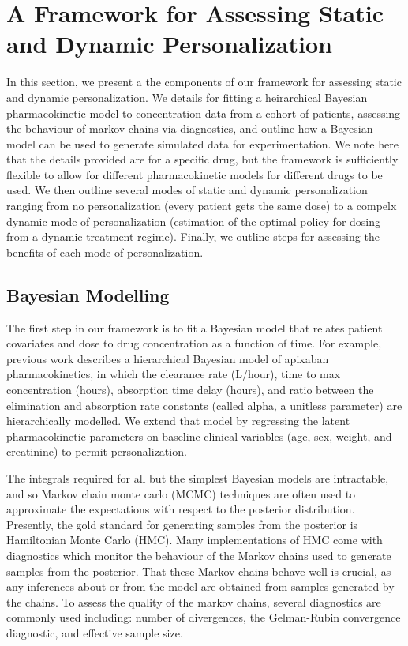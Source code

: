 \section{A Framework for Assessing Static and Dynamic Personalization}\label{ss:framework}

In this section, we present a the components of our framework for assessing static and dynamic personalization.  We details for fitting a heirarchical Bayesian pharmacokinetic model to concentration data from a cohort of patients, assessing the behaviour of markov chains via diagnostics, and outline how a Bayesian model can be used to generate simulated data for experimentation.  We note here that the details provided are for a specific drug, but the framework is sufficiently flexible to allow for different pharmacokinetic models for different drugs to be used. We then outline several modes of static and dynamic personalization ranging from no personalization (every patient gets the same dose) to a compelx dynamic mode of personalization (estimation of the optimal policy for dosing from a dynamic treatment regime).  Finally, we outline steps for assessing the benefits of each mode of personalization.

\subsection{Bayesian Modelling}

The first step in our framework is to fit a Bayesian model that relates patient covariates and dose to drug concentration as a function of time. For example, previous work \cite{pananos2020comparisons} describes a hierarchical Bayesian model of apixaban pharmacokinetics, in which the clearance rate (L/hour), time to max concentration (hours), absorption time delay (hours), and ratio between the elimination and absorption rate constants (called alpha, a unitless parameter) are hierarchically modelled.  We extend that model by regressing the latent pharmacokinetic parameters on baseline clinical variables (age, sex, weight, and creatinine) to permit personalization.

The integrals required for all but the simplest Bayesian models are intractable, and so Markov chain monte carlo (MCMC) techniques are often used to approximate the expectations with respect to the posterior distribution.  Presently, the gold standard for generating samples from the posterior is Hamiltonian Monte Carlo (HMC).  Many implementations of HMC come with diagnostics which monitor the behaviour of the Markov chains used to generate samples from the posterior. That these Markov chains behave well is crucial, as any inferences about or from the model are obtained from samples generated by the chains. To assess the quality of the markov chains, several diagnostics are commonly used including: number of divergences, the Gelman-Rubin convergence diagnostic, and effective sample size.  

